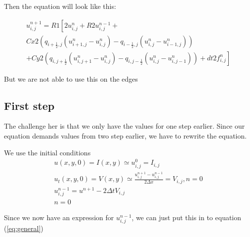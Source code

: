 \documentclass[norsk,11pt,a4paper]{article}
\begin{document}
Then the equation will look like this:

\begin{equation} \label{eq:general}
\begin{aligned}
u^{n+1}_{i,j} = R1\left[ 2u^n_{i,j}+R2u^{n-1}_{i,j} + \right.\\
\left.Cx2\left(q_{i+\frac{1}{2},j}(u^n_{i+1,j}-u^n_{i,j})-q_{i-\frac{1}{2},j}(u^n_{i,j}-u^n_{i-1,j})\right)\right. \\
+ \left.Cy2\left(q_{i,j+\frac{1}{2}}(u^n_{i,j+1}-u^n_{i,j})-q_{i,j-\frac{1}{2}}(u^n_{i,j}-u^n_{i,j-1})\right) + dt2 f^n_{i,j}\right]
\end{aligned}
\end{equation}

But we are not able to use this on the edges
\subsection*{First step}
The challenge her is that we only have the values for one step earlier. Since our equation demands
values from two step earlier, we have to rewrite the equation.

We use the initial conditions
\begin{equation}
	\begin{aligned}
	u(x,y,0) = I(x,y) \simeq u^0_{i,j} = I_{i,j}\\
	u_t(x,y,0) = V(x,y) \simeq \frac{u^{n+1}_{i,j}-u^{n-1}_{i,j}}{2\Delta x} = V_{i,j}, n=0 \\
	u^{n-1}_{i,j} = u^{n+1}-2\Delta t V_{i,j}\\
	n = 0
	\end{aligned}
\end{equation}

Since we now have an expression for $u^{n-1}_{i,j}$, we can just put this in to equation (\ref{eq:general})
\end{document}
